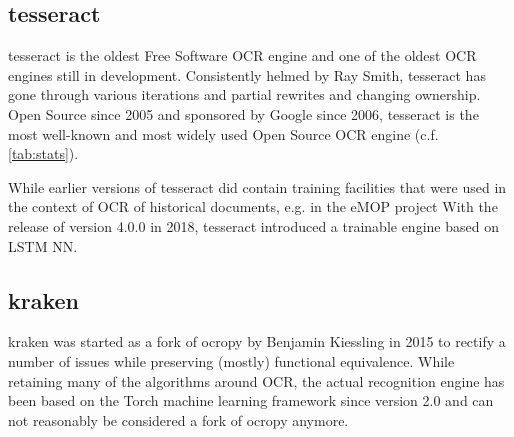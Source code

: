\documentclass[conference]{IEEEtran}
\begin{document}

\subsection*{tesseract}

tesseract \cite{4376991} is the oldest Free Software OCR engine and one of the oldest OCR engines still in development. Consistently helmed by Ray Smith, tesseract has gone through various iterations and partial rewrites and changing ownership. Open Source since 2005 and sponsored by Google since 2006, tesseract is the most well-known and most widely used Open Source OCR engine (c.f. \cref{tab:stats}).

While earlier versions of tesseract did contain training facilities that were used in the context of OCR of historical documents, e.g. in the eMOP project 
\cite{doi:10.1093/llc/fqv062}
With the release of version 4.0.0 in 2018, tesseract introduced a trainable engine based on LSTM NN. 

\subsection*{kraken}

kraken \cite{DBLP:journals/corr/RomanovMSK17} was started as a fork of ocropy by Benjamin Kiessling in 2015 to rectify a number of issues while preserving (mostly) functional equivalence. While retaining many of the algorithms around OCR, the actual recognition engine has been based on the Torch machine learning framework since version 2.0 and can not reasonably be considered a fork of ocropy anymore.
\end{document}
